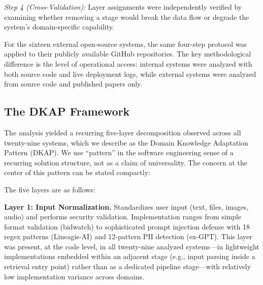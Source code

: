 \documentclass[fleqn,10pt,lineno]{wlpeerj}
\begin{document}
\textit{Step 4 (Cross-Validation):} Layer assignments were independently verified by examining whether removing a stage would break the data flow or degrade the system's domain-specific capability.

For the sixteen external open-source systems, the same four-step protocol was applied to their publicly available GitHub repositories. The key methodological difference is the level of operational access: internal systems were analyzed with both source code and live deployment logs, while external systems were analyzed from source code and published papers only.

\subsection{The DKAP Framework}

The analysis yielded a recurring five-layer decomposition observed across all twenty-nine systems, which we describe as the Domain Knowledge Adaptation Pattern (DKAP). We use ``pattern'' in the software engineering sense of a recurring solution structure, not as a claim of universality. The concern at the center of this pattern can be stated compactly:

\begin{center}
\end{center}

The five layers are as follows:

\textbf{Layer 1: Input Normalization.} Standardizes user input (text, files, images, audio) and performs security validation. Implementation ranges from simple format validation (bidwatch) to sophisticated prompt injection defense with 18 regex patterns (Lineagis-AI) and 12-pattern PII detection (ex-GPT). This layer was present, at the code level, in all twenty-nine analyzed systems---in lightweight implementations embedded within an adjacent stage (e.g., input parsing inside a retrieval entry point) rather than as a dedicated pipeline stage---with relatively low implementation variance across domains.
\end{document}
